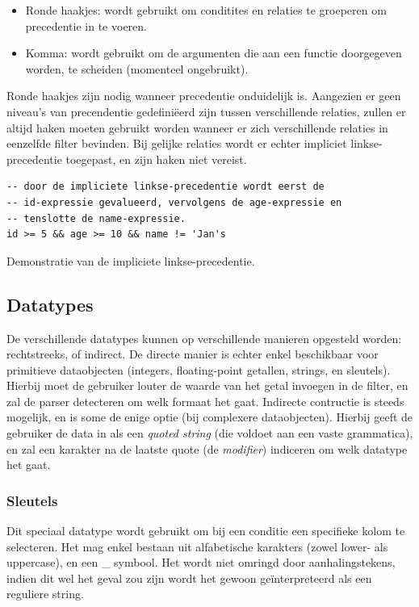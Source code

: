 \begin{itemize}
\item{Ronde haakjes: wordt gebruikt om conditites en relaties te groeperen om precedentie in te voeren.}
\item{Komma: wordt gebruikt om de argumenten die aan een functie doorgegeven worden, te scheiden (momenteel ongebruikt).}
\end{itemize}

Ronde haakjes zijn nodig wanneer precedentie onduidelijk is. Aangezien er geen niveau's van precendentie gedefini\"eerd zijn tussen verschillende relaties, zullen er altijd haken moeten gebruikt worden wanneer er zich verschillende relaties in eenzelfde filter bevinden. Bij gelijke relaties wordt er echter impliciet linkse-precedentie toegepast, en zijn haken niet vereist.

\begin{code}
\begin{verbatim}
-- door de impliciete linkse-precedentie wordt eerst de
-- id-expressie gevalueerd, vervolgens de age-expressie en
-- tenslotte de name-expressie.
id >= 5 && age >= 10 && name != 'Jan's

\end{verbatim}
\caption{Demonstratie van de impliciete linkse-precedentie.}
\end{code}

\subsection{Datatypes}

De verschillende datatypes kunnen op verschillende manieren opgesteld worden: rechtstreeks, of indirect. De directe manier is echter enkel beschikbaar voor primitieve dataobjecten (integers, floating-point getallen, strings, en sleutels). Hierbij moet de gebruiker louter de waarde van het getal invoegen in de filter, en zal de parser detecteren om welk formaat het gaat.
Indirecte contructie is steeds mogelijk, en is some de enige optie (bij complexere dataobjecten). Hierbij geeft de gebruiker de data in als een \emph{quoted string} (die voldoet aan een vaste grammatica), en zal een karakter na de laatste quote (de \emph{modifier}) indiceren om welk datatype het gaat.

\subsubsection{Sleutels}

Dit speciaal datatype wordt gebruikt om bij een conditie een specifieke kolom te selecteren. Het mag enkel bestaan uit alfabetische karakters (zowel lower- als uppercase), en een \_ symbool. Het wordt niet omringd door aanhalingstekens, indien dit wel het geval zou zijn wordt het gewoon ge\"interpreteerd als een reguliere string.

